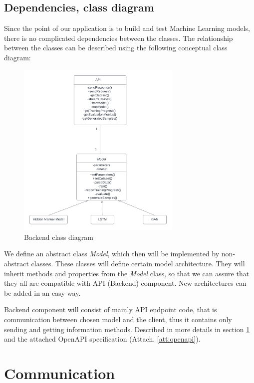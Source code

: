 \documentclass{article}
\begin{document}
\subsection{Dependencies, class diagram}
Since the point of our application is to build and test Machine Learning models, there is no complicated dependencies between the classes. The relationship between the classes can be described using the following conceptual class diagram:

\begin{figure}[H]
    \centering
    \includegraphics[width=0.7\textwidth]{classdiagram.png}
    \caption{Backend class diagram}
\end{figure}

We define an abstract class \textit{Model}, which then will be implemented by non-abstract classes. These classes will define certain model architecture. They will inherit methods and properties from the \textit{Model} class, so that we can assure that they all are compatible with API (Backend) component. New architectures can be added in an easy way.

Backend component will consist of mainly API endpoint code, that is communication between chosen model and the client, thus it contains only sending and getting information methods. Described in more details in section \ref{sec:communication} and the attached OpenAPI specification (Attach. \ref{att:openapi}).



\section{Communication} \label{sec:communication} %
\end{document}
